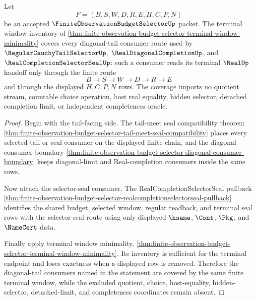 \begin{theorem}
\label{thm:finite-observation-budget-selector-diagonal-tail-coverage}
Let
$$
F=(B,S,W,D,R,E,H,C,P,N)
$$
be an accepted $\FiniteObservationBudgetSelectorUp$ packet. The terminal window inventory of \autoref{thm:finite-observation-budget-selector-terminal-window-minimality} covers every diagonal-tail consumer route used by $\RegularCauchyTailSelectorUp$, $\RealDiagonalCompletionUp$, and $\RealCompletionSelectorSealUp$: such a consumer reads its terminal $\RealUp$ handoff only through the finite route
$$
B \to S \to W \to D \to R \to E
$$
and through the displayed $H,C,P,N$ rows. The coverage imports no quotient stream, countable choice operation, host real equality, hidden selector, detached completion limit, or independent completeness oracle.
\end{theorem}
\begin{proof}
Begin with the tail-facing side. The tail-meet seal compatibility theorem \autoref{thm:finite-observation-budget-selector-tail-meet-seal-compatibility} places every selected-tail or seal consumer on the displayed finite chain, and the diagonal consumer boundary \autoref{thm:finite-observation-budget-selector-diagonal-consumer-boundary} keeps diagonal-limit and Real-completion consumers inside the same rows.

Now attach the selector-seal consumer. The RealCompletionSelectorSeal pullback \autoref{thm:finite-observation-budget-selector-realcompletionselectorseal-pullback} identifies the shared budget, selected window, regular readback, and terminal seal rows with the selector-seal route using only displayed $\hsame$, $\Cont$, $\Pkg$, and $\NameCert$ data.

Finally apply terminal window minimality, \autoref{thm:finite-observation-budget-selector-terminal-window-minimality}. Its inventory is sufficient for the terminal endpoint and loses exactness when a displayed row is removed. Therefore the diagonal-tail consumers named in the statement are covered by the same finite terminal window, while the excluded quotient, choice, host-equality, hidden-selector, detached-limit, and completeness coordinates remain absent.
\end{proof}

